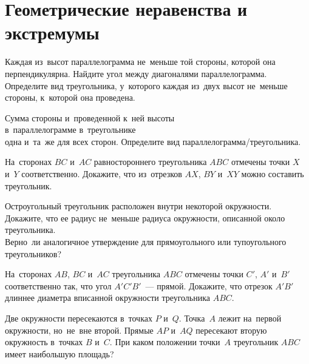 
\section*{Геометрические неравенства и экстремумы}


\begin{problems}

\item
\subproblem
Каждая из~высот параллелограмма не~меньше той стороны, которой она
перпендикулярна.
Найдите угол между диагоналями параллелограмма.
\\
\subproblem
Определите вид треугольника, у~которого каждая из~двух высот не~меньше стороны,
к~которой она проведена.

\item
Сумма стороны и~проведенной к~ней высоты
\\
\subproblem в~параллелограмме
\quad
\subproblem в~треугольнике
\\
одна и~та~же для всех сторон.
Определите вид параллелограмма/треугольника.

\item
На~сторонах $BC$ и~$AC$ равностороннего треугольника $ABC$ отмечены
точки $X$ и~$Y$ соответственно.
Докажите, что из~отрезков $AX$, $BY$ и~$XY$ можно составить треугольник.

\item
\subproblem
Остроугольный треугольник расположен внутри некоторой окружности.
Докажите, что ее радиус не~меньше радиуса окружности, описанной около
треугольника.
\\
\subproblem
Верно~ли аналогичное утверждение для прямоугольного или тупоугольного
треугольников?

\item
На~сторонах $AB$, $BC$ и~$AC$ треугольника $ABC$ отмечены
точки $C'$, $A'$ и~$B'$ соответственно так, что угол $A'C'B'$~--- прямой.
Докажите, что отрезок $A'B'$ длиннее диаметра вписанной окружности
треугольника $ABC$.

\item
Две окружности пересекаются в~точках $P$ и~$Q$.
Точка~$A$ лежит на~первой окружности, но~не~вне второй.
Прямые $AP$ и~$AQ$ пересекают вторую окружность в~точках $B$ и~$C$.
При каком положении точки~$A$ треугольник $ABC$ имеет наибольшую площадь?


\end{problems}
